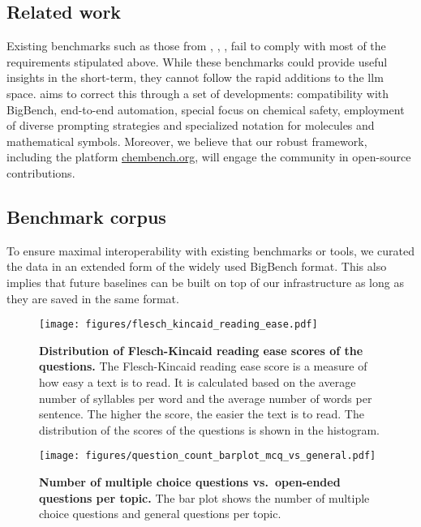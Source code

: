 \subsection{Related work}
Existing benchmarks such as those from \textcite{guo2023large}, \cite{sun2023scieval}, \textcite{Schulze_Balhorn_2024}, \textcite{Cai_2024} fail to comply with most of the requirements stipulated above. 
While these benchmarks could provide useful insights in the short-term, they cannot follow the rapid additions to the \gls{llm} space. 
\chembench aims to correct this through a set of developments: compatibility with BigBench, end-to-end automation, special focus on chemical safety, employment of diverse prompting strategies and specialized notation for molecules and mathematical symbols. 
Moreover, we believe that our robust framework, including the platform \url{chembench.org}, will engage the community in open-source contributions.


\subsection{Benchmark corpus}
To ensure maximal interoperability with existing benchmarks or tools, we curated the data in an extended form of the widely used BigBench format.\cite{srivastava2022beyond}
This also implies that future baselines can be built on top of our infrastructure as long as they are saved in the same format.

\begin{figure}[htb]
    \centering
    \texttt{[image: figures/flesch\_kincaid\_reading\_ease.pdf]}
    \caption{\textbf{Distribution of Flesch-Kincaid reading ease scores of the questions.} The Flesch-Kincaid reading ease score\cite{flesch1948new} is a measure of how easy a text is to read. It is calculated based on the average number of syllables per word and the average number of words per sentence. The higher the score, the easier the text is to read. The distribution of the scores of the questions is shown in the histogram. }
    \label{fig:flesch_kincaid_reading_ease}
\end{figure}

\begin{figure}[htb]
    \centering
    \texttt{[image: figures/question\_count\_barplot\_mcq\_vs\_general.pdf]}
    \caption{\textbf{Number of multiple choice questions vs.\ open-ended questions per topic.} The bar plot shows the number of multiple choice questions and general questions per topic.}
    \label{fig:question_count_barplot_mcq_vs_general}
\end{figure}

